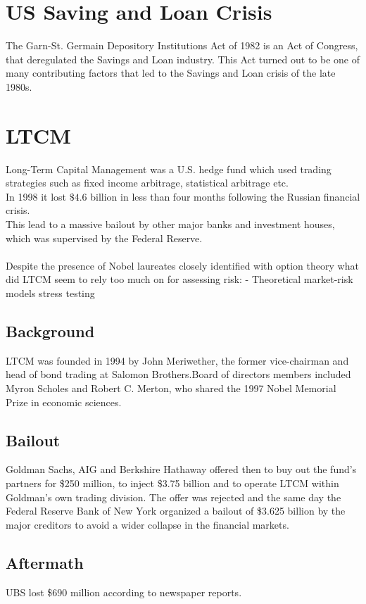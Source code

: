 \documentclass[12pt, a4paper]{report}
\begin{document}
\section{US Saving and Loan Crisis}
The Garn-St. Germain Depository Institutions Act of 1982 is an Act
of Congress, that deregulated the Savings and Loan industry. This
Act turned out to be one of many contributing factors that led to
the Savings and Loan crisis of the late 1980s.

\section {LTCM}
Long-Term Capital Management was a U.S. hedge fund which used
trading strategies such as fixed income arbitrage, statistical
arbitrage etc.\\ In 1998 it lost $\$4.6$ billion in less than four
months following the Russian financial crisis. \\This lead to a
massive bailout by other major banks and investment houses,
 which was supervised by the Federal Reserve.
\\
\\
Despite the presence of Nobel laureates closely identified with
option theory what did LTCM seem to rely too much on for assessing
risk: - Theoretical market-risk models stress testing

\subsection{Background}
LTCM was founded in 1994 by John Meriwether, the former
vice-chairman and head of bond trading at Salomon Brothers.Board
of directors members included Myron Scholes and Robert C. Merton,
who shared the 1997 Nobel Memorial Prize in economic sciences.

\subsection{Bailout}
Goldman Sachs, AIG and Berkshire Hathaway offered then to buy out
the fund's partners for \$250 million, to inject \$3.75 billion
and to operate LTCM within Goldman's own trading division. The
offer was rejected and the same day the Federal Reserve Bank of
New York organized a bailout of \$3.625 billion by the major
creditors to avoid a wider collapse in the financial markets.

\subsection{Aftermath } UBS lost \$690 million according to
newspaper reports.
\end{document}
